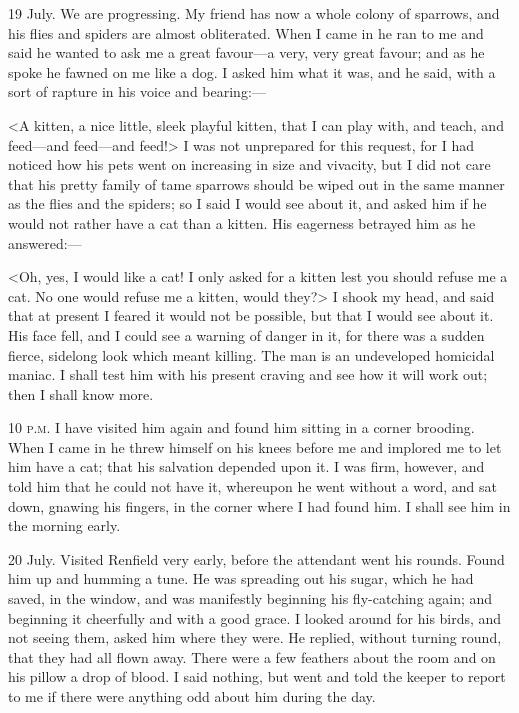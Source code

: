 \begin{diary}{19 July.}
We are progressing. My friend has now a whole colony of sparrows, and his flies and spiders are almost obliterated. When I came in he ran to me and said he wanted to ask me a great favour—a very, very great favour; and as he spoke he fawned on me like a dog. I asked him what it was, and he said, with a sort of rapture in his voice and bearing:—

<A kitten, a nice little, sleek playful kitten, that I can play with, and teach, and feed—and feed—and feed!> I was not unprepared for this request, for I had noticed how his pets went on increasing in size and vivacity, but I did not care that his pretty family of tame sparrows should be wiped out in the same manner as the flies and the spiders; so I said I would see about it, and asked him if he would not rather have a cat than a kitten. His eagerness betrayed him as he answered:—

<Oh, yes, I would like a cat! I only asked for a kitten lest you should refuse me a cat. No one would refuse me a kitten, would they?> I shook my head, and said that at present I feared it would not be possible, but that I would see about it. His face fell, and I could see a warning of danger in it, for there was a sudden fierce, sidelong look which meant killing. The man is an undeveloped homicidal maniac. I shall test him with his present craving and see how it will work out; then I shall know more.
\end{diary}
 
\begin{diary}{10 \textsc{p.m.}}
I have visited him again and found him sitting in a corner brooding. When I came in he threw himself on his knees before me and implored me to let him have a cat; that his salvation depended upon it. I was firm, however, and told him that he could not have it, whereupon he went without a word, and sat down, gnawing his fingers, in the corner where I had found him. I shall see him in the morning early.
\end{diary}
 
\begin{diary}{20 July.}
Visited Renfield very early, before the attendant went his rounds. Found him up and humming a tune. He was spreading out his sugar, which he had saved, in the window, and was manifestly beginning his fly-catching again; and beginning it cheerfully and with a good grace. I looked around for his birds, and not seeing them, asked him where they were. He replied, without turning round, that they had all flown away. There were a few feathers about the room and on his pillow a drop of blood. I said nothing, but went and told the keeper to report to me if there were anything odd about him during the day.
\end{diary}
 
